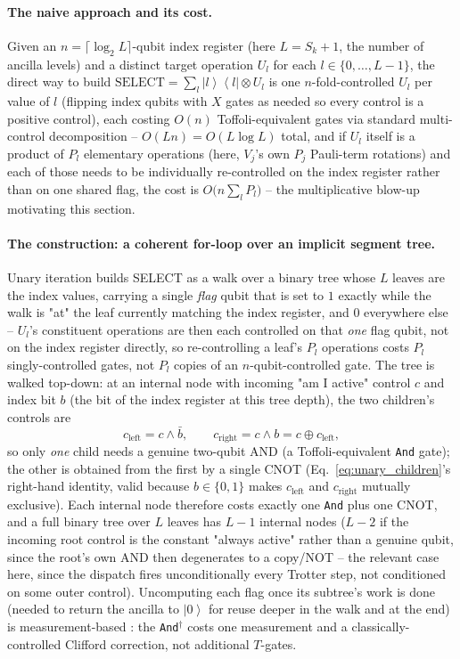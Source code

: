 \documentclass[11pt]{article}
\renewcommand{\ket}[1]{\left| #1 \right\rangle}
\renewcommand{\bra}[1]{\left\langle #1 \right|}
\begin{document}
\paragraph{The naive approach and its cost.} Given an $n=\lceil\log_2 L\rceil$-qubit index register (here $L=S_k+1$, the number of ancilla levels) and a distinct target operation $U_l$ for each $l\in\{0,\ldots,L-1\}$, the direct way to build $\text{SELECT}=\sum_l\ket{l}\bra{l}\otimes U_l$ is one $n$-fold-controlled $U_l$ per value of $l$ (flipping index qubits with $X$ gates as needed so every control is a positive control), each costing $O(n)$ Toffoli-equivalent gates via standard multi-control decomposition -- $O(Ln)=O(L\log L)$ total, and if $U_l$ itself is a product of $P_l$ elementary operations (here, $V_j$'s own $P_j$ Pauli-term rotations) and each of those needs to be individually re-controlled on the index register rather than on one shared flag, the cost is $O\big(n\sum_lP_l\big)$ -- the multiplicative blow-up motivating this section.

\paragraph{The construction: a coherent for-loop over an implicit segment tree.} Unary iteration \cite{Babbush2018} builds SELECT as a walk over a binary tree whose $L$ leaves are the index values, carrying a single \emph{flag} qubit that is set to $1$ exactly while the walk is "at" the leaf currently matching the index register, and $0$ everywhere else -- $U_l$'s constituent operations are then each controlled on that \emph{one} flag qubit, not on the index register directly, so re-controlling a leaf's $P_l$ operations costs $P_l$ singly-controlled gates, not $P_l$ copies of an $n$-qubit-controlled gate. The tree is walked top-down: at an internal node with incoming "am I active" control $c$ and index bit $b$ (the bit of the index register at this tree depth), the two children's controls are
\begin{equation}\label{eq:unary_children}
    c_{\text{left}} = c\wedge\bar b, \qquad c_{\text{right}} = c\wedge b = c\oplus c_{\text{left}},
\end{equation}
so only \emph{one} child needs a genuine two-qubit AND (a Toffoli-equivalent \texttt{And} gate); the other is obtained from the first by a single CNOT (Eq.~\eqref{eq:unary_children}'s right-hand identity, valid because $b\in\{0,1\}$ makes $c_{\text{left}}$ and $c_{\text{right}}$ mutually exclusive). Each internal node therefore costs exactly one \texttt{And} plus one CNOT, and a full binary tree over $L$ leaves has $L-1$ internal nodes ($L-2$ if the incoming root control is the constant "always active" rather than a genuine qubit, since the root's own AND then degenerates to a copy/NOT -- the relevant case here, since the dispatch fires unconditionally every Trotter step, not conditioned on some outer control). Uncomputing each flag once its subtree's work is done (needed to return the ancilla to $\ket0$ for reuse deeper in the walk and at the end) is measurement-based \cite{Gidney2019}: the \texttt{And}$^\dagger$ costs one measurement and a classically-controlled Clifford correction, not additional $T$-gates.
\end{document}
